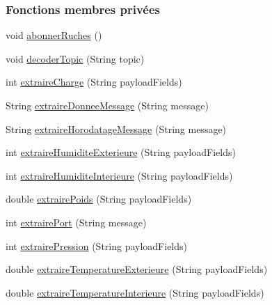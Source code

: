 \subsubsection*{Fonctions membres privées}
\begin{DoxyCompactItemize}
\item 
void \hyperlink{classcom_1_1example_1_1bee__honeyt_1_1_i_h_m_mobile_ac255143b5796de6ee0be9852d2b89396}{abonner\+Ruches} ()
\item 
void \hyperlink{classcom_1_1example_1_1bee__honeyt_1_1_i_h_m_mobile_a7bc9099049f98bcc154c1e8d9f773133}{decoder\+Topic} (String topic)
\item 
int \hyperlink{classcom_1_1example_1_1bee__honeyt_1_1_i_h_m_mobile_a1c9c8df9039fc494293b40011ddf6f5e}{extraire\+Charge} (String payload\+Fields)
\item 
String \hyperlink{classcom_1_1example_1_1bee__honeyt_1_1_i_h_m_mobile_a2f781039138b814510102847e70917a1}{extraire\+Donnee\+Message} (String message)
\item 
String \hyperlink{classcom_1_1example_1_1bee__honeyt_1_1_i_h_m_mobile_aabe15decc02b7f56a82f60dac75f8c2f}{extraire\+Horodatage\+Message} (String message)
\item 
int \hyperlink{classcom_1_1example_1_1bee__honeyt_1_1_i_h_m_mobile_a9a8131f2198266585e602e6fe9d29ef0}{extraire\+Humidite\+Exterieure} (String payload\+Fields)
\item 
int \hyperlink{classcom_1_1example_1_1bee__honeyt_1_1_i_h_m_mobile_afb44a51a66e904c2b3e5229ab5144f56}{extraire\+Humidite\+Interieure} (String payload\+Fields)
\item 
double \hyperlink{classcom_1_1example_1_1bee__honeyt_1_1_i_h_m_mobile_ad702e818ba1d861f26accfd6a0194b86}{extraire\+Poids} (String payload\+Fields)
\item 
int \hyperlink{classcom_1_1example_1_1bee__honeyt_1_1_i_h_m_mobile_abc4571bc8b1400c6d75c0a2594b0abe6}{extraire\+Port} (String message)
\item 
int \hyperlink{classcom_1_1example_1_1bee__honeyt_1_1_i_h_m_mobile_ad49ff3588da89162f21ca8e983a0fb4c}{extraire\+Pression} (String payload\+Fields)
\item 
double \hyperlink{classcom_1_1example_1_1bee__honeyt_1_1_i_h_m_mobile_a80b9ad15fb6aa3591cf600892b1325b9}{extraire\+Temperature\+Exterieure} (String payload\+Fields)
\item 
double \hyperlink{classcom_1_1example_1_1bee__honeyt_1_1_i_h_m_mobile_a714f52f4793f22a08a773b1bf35dd015}{extraire\+Temperature\+Interieure} (String payload\+Fields)

\end{DoxyCompactItemize}
